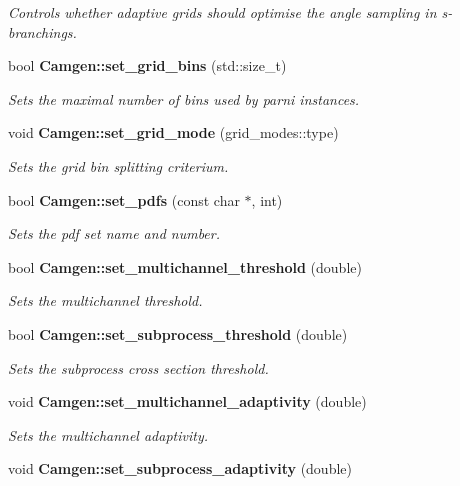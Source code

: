 \begin{DoxyCompactItemize}
\begin{DoxyCompactList}\small\item\em Controls whether adaptive grids should optimise the angle sampling in s-\/branchings. \end{DoxyCompactList}\item 
bool {\bfseries Camgen\+::set\+\_\+grid\+\_\+bins} (std\+::size\+\_\+t)
\begin{DoxyCompactList}\small\item\em Sets the maximal number of bins used by parni instances. \end{DoxyCompactList}\item 
\hypertarget{a00878_aa5ed3db24f82c90ae214ae9fa63e6ec3}{}void {\bfseries Camgen\+::set\+\_\+grid\+\_\+mode} (grid\+\_\+modes\+::type)\label{a00878_aa5ed3db24f82c90ae214ae9fa63e6ec3}

\begin{DoxyCompactList}\small\item\em Sets the grid bin splitting criterium. \end{DoxyCompactList}\item 
bool {\bfseries Camgen\+::set\+\_\+pdfs} (const char $\ast$, int)
\begin{DoxyCompactList}\small\item\em Sets the pdf set name and number. \end{DoxyCompactList}\item 
bool {\bfseries Camgen\+::set\+\_\+multichannel\+\_\+threshold} (double)
\begin{DoxyCompactList}\small\item\em Sets the multichannel threshold. \end{DoxyCompactList}\item 
bool {\bfseries Camgen\+::set\+\_\+subprocess\+\_\+threshold} (double)
\begin{DoxyCompactList}\small\item\em Sets the subprocess cross section threshold. \end{DoxyCompactList}\item 
\hypertarget{a00878_a2a74e7d3f4062e80869473e1c8b6d5ce}{}void {\bfseries Camgen\+::set\+\_\+multichannel\+\_\+adaptivity} (double)\label{a00878_a2a74e7d3f4062e80869473e1c8b6d5ce}

\begin{DoxyCompactList}\small\item\em Sets the multichannel adaptivity. \end{DoxyCompactList}\item 
\hypertarget{a00878_af939a054b626ba0508517fc90f5aa285}{}void {\bfseries Camgen\+::set\+\_\+subprocess\+\_\+adaptivity} (double)\label{a00878_af939a054b626ba0508517fc90f5aa285}


\end{DoxyCompactItemize}
